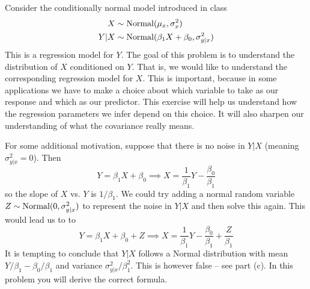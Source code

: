\begin{exercise}
Consider the conditionally normal model introduced in class
\begin{align*}
X &\sim {\rm Normal}(\mu_x,\sigma_x^2)\\
Y|X &\sim {\rm Normal}(\beta_1X + \beta_0,\sigma_{y|x}^2)
\end{align*}
This is a regression model for $Y$. The goal of this problem is to understand the distribution of $X$ conditioned on $Y$. That is, we would like to understand the corresponding regression model for $X$. This is important, because in some applications we have to make a choice about which variable to take as our response and which as our predictor. This exercise will help us understand how the regression parameters we infer depend on this choice. It will also sharpen our understanding of what the covariance really means.  


For some additional motivation, suppose that there is no noise in $Y|X$ (meaning $\sigma_{y|x}^2=0$). Then 
\begin{equation*}
Y =\beta_1X + \beta_0 \implies X = \frac{1}{\beta_1}Y - \frac{\beta_0}{\beta_1}
\end{equation*}
so the slope of $X$ vs.  $Y$ is $1/\beta_1$. We could try adding a normal random variable $Z \sim {\rm Normal}(0,\sigma_{y|x}^2)$ to represent the noise in $Y|X$ and then solve this again. This would lead us to to 
\begin{equation*}
Y =\beta_1X + \beta_0 + Z \implies X=  \frac{1}{\beta_1}Y - \frac{\beta_0}{\beta_1} + \frac{Z}{\beta_1}
\end{equation*}
It is tempting to conclude that $Y|X$ follows a Normal distribution with mean $Y/\beta_1 - \beta_0/\beta_1$ and variance $\sigma_{y|x}^2/\beta_1^2$. This is however false -- see part (c). In this problem you will derive the correct formula. 



\end{exercise}
